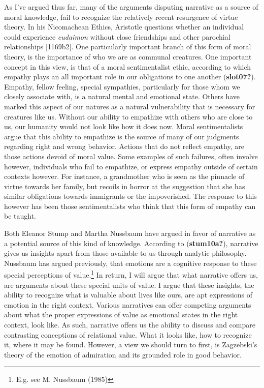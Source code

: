 \documentclass[12pt]{book}
\theoremstyle{definition}
\theoremstyle{remark}
\begin{document}
As I've argued thus far, many of the arguments disputing narrative as a source of moral knowledge, fail to recognize the relatively recent resurgence of virtue theory. In his Nicomachean Ethics, Aristotle questions whether an individual could experience \emph{eudaimon} without close friendships and other parochial relationships {[}1169b2{]}. One particularly important branch of this form of moral theory, is the importance of who we are as communal creatures. One important concept in this view, is that of a moral sentimentalist ethic, according to which empathy plays an all important role in our obligations to one another (\textbf{slot07?}). Empathy, fellow feeling, special sympathies, particularly for those whom we closely associate with, is a natural mental and emotional state. Others have marked this aspect of our natures as a natural vulnerability that is necessary for creatures like us. Without our ability to empathize with others who are close to us, our humanity would not look like how it does now. Moral sentimentalists argue that this ability to empathize is the source of many of our judgments regarding right and wrong behavior. Actions that do not reflect empathy, are those actions devoid of moral value. Some examples of such failures, often involve however, individuals who fail to empathize, or express empathy outside of certain contexts however. For instance, a grandmother who is seen as the pinnacle of virtue towards her family, but recoils in horror at the suggestion that she has similar obligations towards immigrants or the impoverished. The response to this however has been those sentimentalists who think that this form of empathy can be taught.

Both Eleanor Stump and Martha Nussbaum have argued in favor of narrative as a potential source of this kind of knowledge. According to (\textbf{stum10a?}), narrative gives us insights apart from those available to us through analytic philosophy. Nussbaum has argued previously, that emotions are a cognitive response to these special perceptions of value.\footnote{E.g. see M. Nussbaum (1985)} In return, I will argue that what narrative offers us, are arguments about these special units of value. I argue that these insights, the ability to recognize what is valuable about lives like ours, are apt expressions of emotion in the right context. Various narratives can offer competing arguments about what the proper expressions of value as emotional states in the right context, look like. As such, narrative offers us the ability to discuss and compare contrasting conceptions of relational value. What it looks like, how to recognize it, where it may be found. However, a view we should turn to first, is Zagzebski's theory of the emotion of admiration and its grounded role in good behavior.
\end{document}
